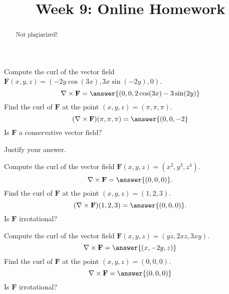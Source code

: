 \documentclass{ximera}
\title{Week 9: Online Homework}
\begin{document}
  
\begin{abstract}  
Not plagiarized!
\end{abstract}  
\maketitle 

\begin{problem}
Compute the curl of the vector field $\mathbf{F}(x,y,z) = (-2y\cos(3x),3x\sin(-2y),0)$.
\[
\nabla\times \mathbf{F} = \answer{(0,0,2\cos(3x)-3\sin(2y)}
\]
Find the curl of $\mathbf{F}$ at the point $(x,y,z) = (\pi,\pi,\pi)$.
\[
(\nabla\times \mathbf{F})(\pi,\pi,\pi) = \answer{(0,0,-2}
\]
Is $\mathbf{F}$ a conservative vector field?
\begin{multipleChoice}
\end{multipleChoice}
Justify your answer.
\begin{freeResponse}
\end{freeResponse}
\end{problem}

\begin{problem}
Compute the curl of the vector field $\mathbf{F}(x,y,z) = (x^2, y^3, z^4)$.
\[
\nabla\times \mathbf{F} = \answer{(0,0,0)}.
\]
Find the curl of $\mathbf{F}$ at the point $(x,y,z) = (1,2,3)$.
\[
(\nabla\times \mathbf{F})(1,2,3) = \answer{(0,0,0)}.
\]
Is $\mathbf{F}$ irrotational?
\begin{multipleChoice}
\end{multipleChoice}
\end{problem}

\begin{problem}
Compute the curl of the vector field $\mathbf{F}(x,y,z) = (yz, 2xz, 3xy)$.
\[
\nabla\times \mathbf{F} = \answer{(x, -2y, z)}
\]
Find the curl of $\mathbf{F}$ at the point $(x,y,z) = (0,0,0)$.
\[
\nabla\times \mathbf{F} = \answer{(0, 0, 0)}
\]
Is $\mathbf{F}$ irrotational?
\begin{multipleChoice}
\end{multipleChoice}
\end{problem}
\end{document}
